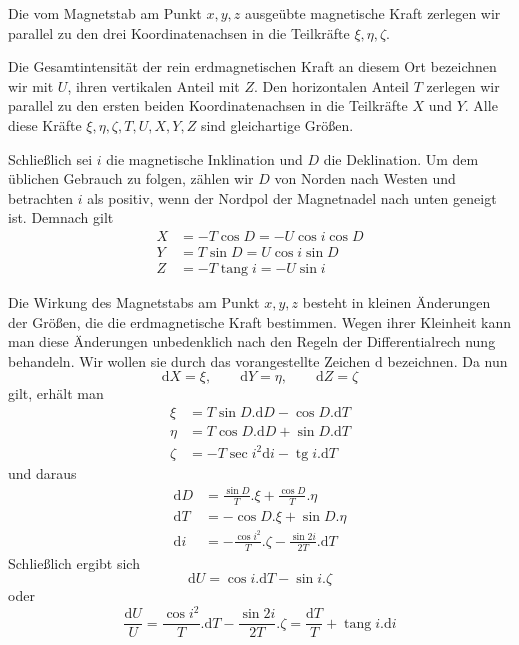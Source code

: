 Die vom Magnetstab am Punkt $x,y,z$ ausgeübte magnetische Kraft zerlegen wir parallel zu den drei Koordinatenachsen in die Teilkräfte $\xi,\eta,\zeta$.

Die Gesamtintensität der rein erdmagnetischen Kraft an diesem Ort bezeichnen wir mit $U$, ihren vertikalen Anteil mit $Z$. Den horizontalen Anteil $T$ zerlegen wir parallel zu den ersten beiden Koordinatenachsen in die Teilkräfte $X$ und $Y$. Alle diese Kräfte $\xi,\eta,\zeta,T,U,X,Y,Z$ sind gleichartige Größen.

Schließlich sei $i$ die magnetische Inklination und $D$ die Deklination. Um dem üblichen Gebrauch zu folgen, zählen wir $D$ von Norden nach Westen und betrachten $i$ als positiv, wenn der Nordpol der Magnetnadel nach unten geneigt ist. Demnach gilt
\[
\begin{aligned}
X&=-T\cos D=-U\cos i\cos D\\
Y&=T\sin D=U\cos i\sin D\\
Z&=-T\operatorname{tang}i=-U\sin i
\end{aligned}
\]

Die Wirkung des Magnetstabs am Punkt $x,y,z$ besteht in kleinen Änderungen der Größen, die die erdmagnetische Kraft bestimmen. Wegen ihrer Kleinheit kann man diese Änderungen unbedenklich nach den Regeln der Differentialrech%
nung behandeln. Wir wollen sie durch das vorangestellte Zeichen $\mathrm{d}$ bezeichnen. Da nun
\[
\mathrm{d}X=\xi,\qquad\mathrm{d}Y=\eta,\qquad\mathrm{d}Z=\zeta
\]
gilt, erhält man
\[
\begin{aligned}
\xi&=T\sin D.\mathrm{d}D-\cos D.\mathrm{d}T\\
\eta&=T\cos D.\mathrm{d}D+\sin D.\mathrm{d}T\\
\zeta&=-T\sec i^2\mathrm{d}i-\operatorname{tg}i.\mathrm{d}T
\end{aligned}
\]
und daraus
\[
\begin{aligned}
\mathrm{d}D&=\frac{\sin D}{T}.\xi+\frac{\cos D}{T}.\eta\\
\mathrm{d}T&=-\cos D.\xi+\sin D.\eta\\
\mathrm{d}i&=-\frac{\cos i^2}{T}.\zeta-\frac{\sin2i}{2T}.\mathrm{d}T
\end{aligned}
\]
Schließlich ergibt sich
\[
\mathrm{d}U=\cos i.\mathrm{d}T-\sin i.\zeta
\]
oder
\[
\frac{\mathrm{d}U}{U}=\frac{\cos i^2}{T}.\mathrm{d}T-\frac{\sin2i}{2T}.\zeta=\frac{\mathrm{d}T}{T}+\operatorname{tang}i.\mathrm{d}i
\]

